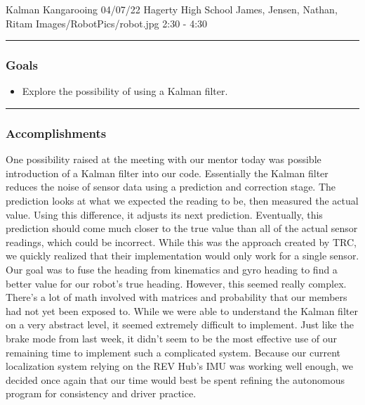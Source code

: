 \insertmeeting 
	{Kalman Kangarooing} 
	{04/07/22} 
	{Hagerty High School}
	{James, Jensen, Nathan, Ritam}
	{Images/RobotPics/robot.jpg}
	{2:30 - 4:30}
	
\noindent\hfil\rule{\textwidth}{.4pt}\hfil
\subsubsection*{Goals}
\begin{itemize}
    \item Explore the possibility of using a Kalman filter.

\end{itemize} 

\noindent\hfil\rule{\textwidth}{.4pt}\hfil

\subsubsection*{Accomplishments}
One possibility raised at the meeting with our mentor today was possible introduction of a Kalman filter into our code. Essentially the Kalman filter reduces the noise of sensor data using a prediction and correction stage. The prediction looks at what we expected the reading to be, then measured the actual value. Using this difference, it adjusts its next prediction. Eventually, this prediction should come much closer to the true value than all of the actual sensor readings, which could be incorrect. While this was the approach created by TRC, we quickly realized that their implementation would only work for a single sensor. Our goal was to fuse the heading from kinematics and gyro heading to find a better value for our robot's true heading. However, this seemed really complex. There's a lot of math involved with matrices and probability that our members had not yet been exposed to. While we were able to understand the Kalman filter on a very abstract level, it seemed extremely difficult to implement. Just like the brake mode from last week, it didn't seem to be the most effective use of our remaining time to implement such a complicated system. Because our current localization system relying on the REV Hub's IMU was working well enough, we decided once again that our time would best be spent refining the autonomous program for consistency and driver practice. 


